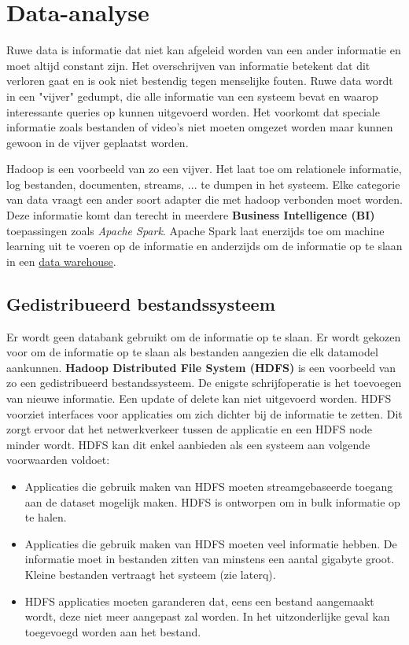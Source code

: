 	
	\chapter{Data-analyse}
	Ruwe data is informatie dat niet kan afgeleid worden van een ander informatie en moet altijd constant zijn. Het overschrijven van informatie betekent dat dit verloren gaat en is ook niet bestendig tegen menselijke fouten. Ruwe data wordt in een "vijver" gedumpt, die alle informatie van een systeem bevat en waarop interessante queries op kunnen uitgevoerd worden. Het voorkomt dat speciale informatie zoals bestanden of video's niet moeten omgezet worden maar kunnen gewoon in de vijver geplaatst worden. 
	
	Hadoop is een voorbeeld van zo een vijver. Het laat toe om relationele informatie, log bestanden, documenten, streams, ... te dumpen in het systeem. Elke categorie van data vraagt een ander soort adapter die met hadoop verbonden moet worden. Deze informatie komt dan terecht in meerdere \textbf{Business Intelligence (BI)} toepassingen zoals \emph{Apache Spark}. Apache Spark laat enerzijds toe om machine learning uit te voeren op de informatie en anderzijds om de informatie op te slaan in een \underline{data warehouse}. 
	
	\section{Gedistribueerd bestandssysteem}
	Er wordt geen databank gebruikt om de informatie op te slaan. Er wordt gekozen voor om de informatie op te slaan als bestanden aangezien die elk datamodel aankunnen. \textbf{Hadoop Distributed File System (HDFS)} is een voorbeeld van zo een gedistribueerd bestandssysteem. De enigste schrijfoperatie is het toevoegen van nieuwe informatie. Een update of delete kan niet uitgevoerd worden. HDFS voorziet interfaces voor applicaties om zich dichter bij de informatie te zetten. Dit zorgt ervoor dat het netwerkverkeer tussen de applicatie en een HDFS node minder wordt. HDFS kan dit enkel aanbieden als een systeem aan volgende voorwaarden voldoet:
	\begin{itemize}
		\item Applicaties die gebruik maken van HDFS moeten streamgebaseerde toegang aan de dataset mogelijk maken. HDFS is ontworpen om in bulk informatie op te halen.
		\item Applicaties die gebruik maken van HDFS moeten veel informatie hebben. De informatie moet in bestanden zitten van minstens een aantal gigabyte groot. Kleine bestanden vertraagt het systeem (zie laterq). 
		\item HDFS applicaties moeten garanderen dat, eens een bestand aangemaakt wordt, deze niet meer aangepast zal worden. In het uitzonderlijke geval kan toegevoegd worden aan het bestand.
	\end{itemize}
